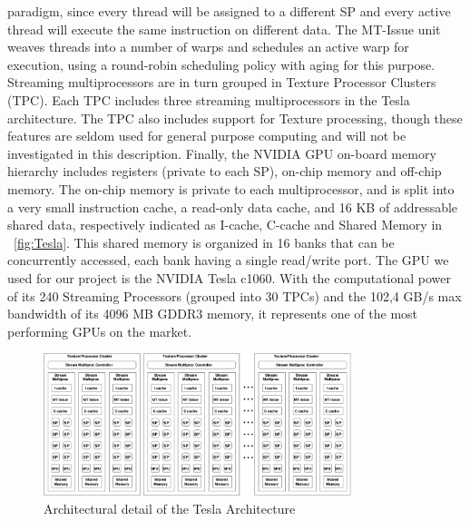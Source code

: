 paradigm, since every thread will be assigned to a different SP and every active thread will execute the
same instruction on different data.\newline
   The MT-Issue unit weaves threads into a number of warps and schedules an active warp for execution,
using a round-robin scheduling policy with aging for this purpose.\newline
   Streaming multiprocessors are in turn grouped in Texture Processor Clusters (TPC). Each TPC includes three streaming
multiprocessors in the Tesla architecture. The TPC also includes support for Texture processing, though these features are
seldom used for general purpose computing and will not be investigated in this description.\newline
   Finally, the NVIDIA GPU on-board memory hierarchy includes registers (private to each SP), on-chip memory and off-chip memory.
The on-chip memory is private to each multiprocessor, and is split into a very small instruction cache, a read-only data cache,
and 16 KB of addressable shared data, respectively indicated as I-cache, C-cache and Shared Memory in \figurename~\ref{fig:Tesla}.
This shared memory is organized in 16 banks that can be concurrently accessed, each bank having a single read/write port.\newline
  The GPU we used for our project is the NVIDIA Tesla c1060. 
 With the computational power of its 240 Streaming Processors (grouped into 30 TPCs) and the 102,4 GB/s max bandwidth of its 4096 MB
GDDR3 memory, it represents one of the most performing GPUs on the market.\newline

\begin{figure}[h]
    \centering
     \includegraphics[width=0.8\textwidth]{./img/nvidiadetail}
\caption{Architectural detail of the Tesla Architecture}\label{fig:teslaarch}
    \end{figure}


